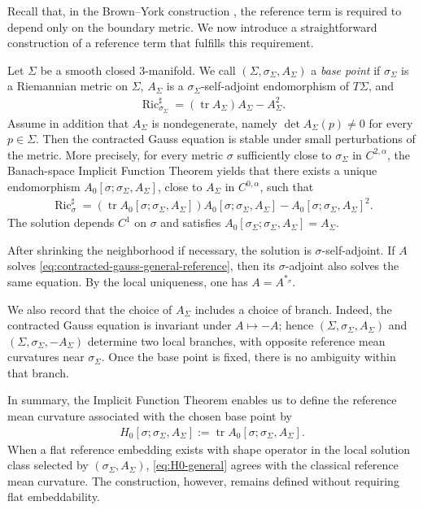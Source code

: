 \documentclass[10pt]{amsart}
\newcommand{\tr}{\operatorname{tr}}
\newcommand{\Ric}{\operatorname{Ric}}
\theoremstyle{plain}
\theoremstyle{remark}
\begin{document}
	Recall that, in the Brown--York construction \cite{BrownYork}, the reference term is
	required to depend only on the boundary metric. We now introduce a straightforward construction of a reference term that fulfills this requirement.
	
	Let $\Sigma$ be a smooth closed $3$-manifold. We call
	$(\Sigma,\sigma_\Sigma,A_\Sigma)$ a \emph{base point} if $\sigma_\Sigma$ is a
	Riemannian metric on $\Sigma$, $A_\Sigma$ is a $\sigma_\Sigma$-self-adjoint
	endomorphism of $T\Sigma$, and
	\begin{align}
		\Ric_{\sigma_\Sigma}^{\sharp}
		=
		(\tr A_\Sigma)A_\Sigma
		-
		A_\Sigma^2 .
	\end{align}
	Assume in addition that $A_\Sigma$ is nondegenerate, namely
	$\det A_\Sigma(p)\neq 0$ for every $p\in\Sigma$. Then the contracted Gauss
	equation is stable under small perturbations of the metric. More precisely, for
	every metric $\sigma$ sufficiently close to $\sigma_\Sigma$ in $C^{2,\alpha}$, the Banach-space Implicit Function Theorem yields that there exists a unique endomorphism
	$A_0[\sigma;\sigma_\Sigma,A_\Sigma]$, close to $A_\Sigma$ in $C^{0,\alpha}$,
	such that
	\begin{align}\label{eq:contracted-gauss-general-reference}
		\Ric_{\sigma}^{\sharp}
		=
		(\tr A_0[\sigma;\sigma_\Sigma,A_\Sigma])
		A_0[\sigma;\sigma_\Sigma,A_\Sigma]
		-
		A_0[\sigma;\sigma_\Sigma,A_\Sigma]^2 .
	\end{align}
	The solution depends $C^1$ on $\sigma$ and satisfies
	$A_0[\sigma_\Sigma;\sigma_\Sigma,A_\Sigma]=A_\Sigma$.
	
	After shrinking the neighborhood if necessary, the solution is
	$\sigma$-self-adjoint. If $A$ solves \eqref{eq:contracted-gauss-general-reference},
	then its $\sigma$-adjoint also solves the same equation. By the local uniqueness,
	one has $A=A^{*_\sigma}$.
	
	We also record that the choice of $A_\Sigma$ includes a choice of branch. Indeed,
	the contracted Gauss equation is invariant under $A\mapsto -A$; hence
	$(\Sigma,\sigma_\Sigma,A_\Sigma)$ and
	$(\Sigma,\sigma_\Sigma,-A_\Sigma)$ determine two local branches, with opposite
	reference mean curvatures near $\sigma_\Sigma$. Once the base point is fixed,
	there is no ambiguity within that branch.
	
	In summary, the Implicit Function Theorem enables us to define the reference mean curvature associated with the chosen base point by
	\begin{align}\label{eq:H0-general}
		H_0[\sigma;\sigma_\Sigma,A_\Sigma]
		:=
		\tr A_0[\sigma;\sigma_\Sigma,A_\Sigma].
	\end{align}
	When a flat reference embedding exists with shape operator in the local solution
	class selected by $(\sigma_\Sigma,A_\Sigma)$, \eqref{eq:H0-general} agrees with
	the classical reference mean curvature. The construction, however, remains
	defined without requiring flat embeddability.
	
\end{document}
